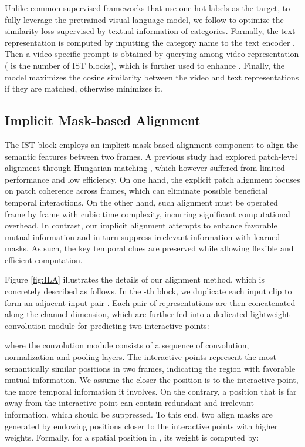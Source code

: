 \documentclass[10pt,twocolumn,letterpaper]{article}
\begin{document}
Unlike common supervised frameworks that use one-hot labels as the target, to fully leverage the pretrained visual-language model, we follow \cite{b24} to optimize the similarity loss supervised by textual information of categories.
Formally, the text representation  is computed by inputting the category name to the text encoder .
Then a video-specific prompt is obtained by querying  among video representation  ( is the number of IST blocks), which is further used to enhance .
Finally, the model maximizes the cosine similarity between the video and text representations if they are matched, otherwise minimizes it.



\subsection{Implicit Mask-based Alignment}
\label{sec:align}
The IST block employs an implicit mask-based alignment component to align the semantic features between two frames.
A previous study \cite{b28} had explored patch-level alignment through Hungarian matching \cite{bertsekas1981new}, which however suffered from limited performance and low efficiency.
On one hand, the explicit patch alignment focuses on patch coherence across frames, which can eliminate possible beneficial temporal interactions.
On the other hand, such alignment must be operated frame by frame with cubic time complexity, incurring significant computational overhead.
In contrast, our implicit alignment attempts to enhance favorable mutual information and in turn suppress irrelevant information with learned masks.
As such, the key temporal clues are preserved while allowing flexible and efficient computation.


Figure \ref{fig:ILA} illustrates the details of our alignment method, which is concretely described as follows.
In the -th block, we duplicate each input clip  to form an adjacent input pair .
Each pair of representations are then concatenated along the channel dimension, which are further fed into a dedicated lightweight convolution module for predicting two interactive points:

where the convolution module  consists of a sequence of convolution, normalization and pooling layers.
The interactive points  represent the most semantically similar positions in two frames, indicating the region with favorable mutual information.
We assume the closer the position is to the interactive point, the more temporal information it involves.
On the contrary, a position that is far away from the interactive point can contain redundant and irrelevant information, which should be suppressed.
To this end, two align masks  are generated by endowing positions closer to the interactive points with higher weights. Formally, for a spatial position  in , its weight  is computed by:
\end{document}
